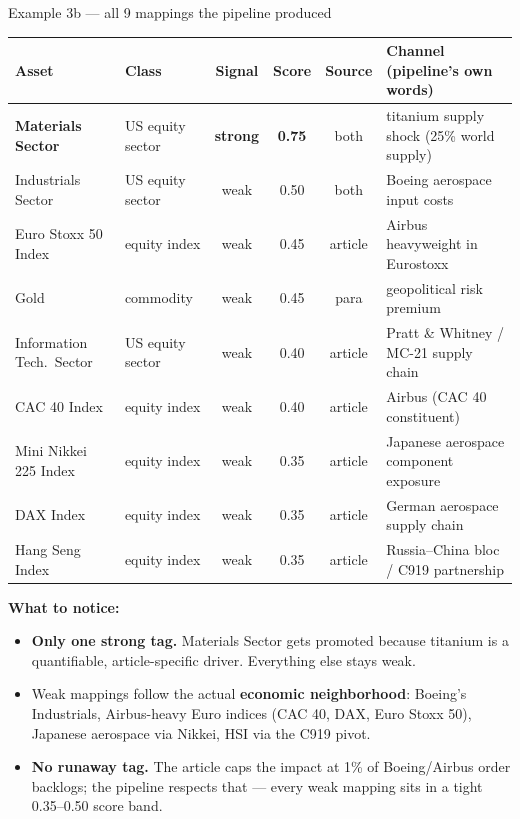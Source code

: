 \documentclass[10pt,aspectratio=169]{beamer}
\begin{document}
\begin{frame}{Example 3b --- all 9 mappings the pipeline produced}
  \scriptsize
  \centering
  \setlength{\tabcolsep}{5pt}
  \renewcommand{\arraystretch}{1.12}
  \begin{tabular}{llcccl}
    \toprule
    \textbf{Asset} & \textbf{Class} & \textbf{Signal} & \textbf{Score} & \textbf{Source} & \textbf{Channel (pipeline's own words)} \\
    \midrule
    \textcolor{goodgreen}{\textbf{Materials Sector}} & US equity sector & \textbf{strong} & \textbf{0.75} & both & titanium supply shock (25\% world supply) \\
    Industrials Sector          & US equity sector & weak & 0.50 & both    & Boeing aerospace input costs \\
    Euro Stoxx 50 Index         & equity index     & weak & 0.45 & article & Airbus heavyweight in Eurostoxx \\
    Gold                        & commodity        & weak & 0.45 & para    & geopolitical risk premium \\
    Information Tech.\ Sector   & US equity sector & weak & 0.40 & article & Pratt \& Whitney / MC-21 supply chain \\
    CAC 40 Index                & equity index     & weak & 0.40 & article & Airbus (CAC 40 constituent) \\
    Mini Nikkei 225 Index       & equity index     & weak & 0.35 & article & Japanese aerospace component exposure \\
    DAX Index                   & equity index     & weak & 0.35 & article & German aerospace supply chain \\
    Hang Seng Index             & equity index     & weak & 0.35 & article & Russia--China bloc / C919 partnership \\
    \bottomrule
  \end{tabular}

  \vspace{0.4em}
  \textcolor{goodgreen}{\textbf{What to notice:}}
  \begin{itemize}\itemsep0.1em
    \item \textbf{Only one strong tag.} Materials Sector gets promoted because titanium is a
          quantifiable, article-specific driver. Everything else stays weak.
    \item Weak mappings follow the actual \textbf{economic neighborhood}: Boeing's Industrials,
          Airbus-heavy Euro indices (CAC 40, DAX, Euro Stoxx 50), Japanese aerospace via
          Nikkei, HSI via the C919 pivot.
    \item \textbf{No runaway tag.} The article caps the impact at 1\% of Boeing/Airbus order
          backlogs; the pipeline respects that --- every weak mapping sits in a tight
          0.35--0.50 score band.
  \end{itemize}
\end{frame}
\end{document}
